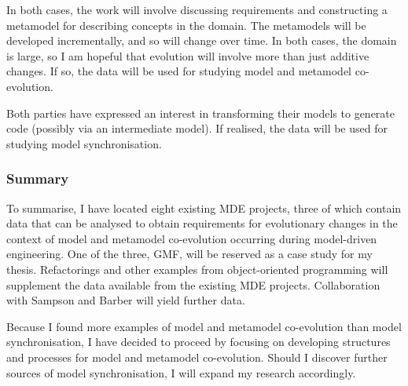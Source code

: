 In both cases, the work will involve discussing requirements and constructing a metamodel for describing concepts in the domain. The metamodels will be developed incrementally, and so will change over time. In both cases, the domain is large, so I am hopeful that evolution will involve more than just additive changes. If so, the data will be used for studying model and metamodel co-evolution.

Both parties have expressed an interest in transforming their models to generate code (possibly via an intermediate model). If realised, the data will be used for studying model synchronisation.


\subsubsection{Summary}
To summarise, I have located eight existing MDE projects, three of which contain data that can be analysed to obtain requirements for evolutionary changes in the context of model and metamodel co-evolution occurring during model-driven engineering. One of the three, GMF, will be reserved as a case study for my thesis. Refactorings and other examples from object-oriented programming will supplement the data available from the existing MDE projects. Collaboration with Sampson and Barber will yield further data.

Because I found more examples of model and metamodel co-evolution than model synchronisation, I have decided to proceed by focusing on developing structures and processes for model and metamodel co-evolution. Should I discover further sources of model synchronisation, I will expand my research accordingly.




